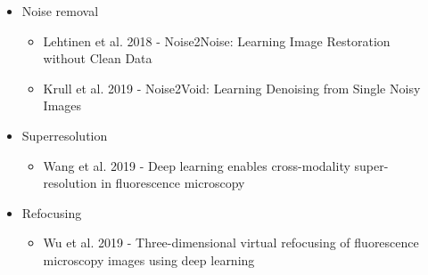 \documentclass[9pt, aspectratio=169]{beamer}
\begin{document}
\begin{frame}
\begin{columns}
\begin{column}{0.8\textwidth}
            \begin{itemize}
                \item Noise removal
                      \begin{itemize}
                          \item Lehtinen et al. 2018 - Noise2Noise: Learning Image Restoration without Clean Data
                          \item Krull et al. 2019 - Noise2Void: Learning Denoising from Single Noisy Images
                      \end{itemize}
                \item Superresolution
                      \begin{itemize}
                          \item Wang et al. 2019 - Deep learning enables cross-modality
                                super-resolution in fluorescence microscopy
                      \end{itemize}
                \item Refocusing
                      \begin{itemize}
                          \item Wu et al. 2019 - Three-dimensional virtual refocusing of fluorescence microscopy images using deep learning
                      \end{itemize}
            \end{itemize}
        \end{column}
        \begin{column}{0.2\textwidth}

\end{column}
\end{columns}
\end{frame}
\end{document}
